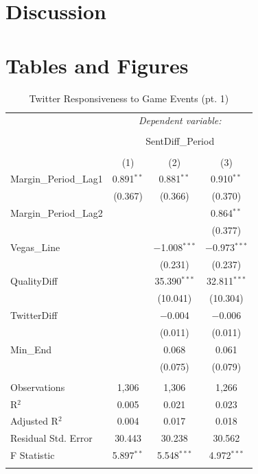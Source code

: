 \documentclass[12pt]{article}
\begin{document}
\begin{doublespacing}
\section{Discussion}



\section{Tables and Figures}

\begin{table}[H] 
\centering 
\caption{Twitter Responsiveness to Game Events (pt. 1)}\label{table:sentresponsiveness} 
\begin{tabular*}{\textwidth}{@{\extracolsep{\fill}}lccc} 
\hline 
\hline
 & \multicolumn{3}{c}{\textit{Dependent variable:}} \\ 
\cline{2-4} 
\\[-3.0ex] & \multicolumn{3}{c}{SentDiff\_Period} \\ 
\\[-1.5ex] & (1) & (2) & (3)\\ 
\hline
 Margin\_Period\_Lag1 & 0.891$^{**}$ & 0.881$^{**}$ & 0.910$^{**}$ \\ 
  & (0.367) & (0.366) & (0.370) \\ 
 Margin\_Period\_Lag2 &  &  & 0.864$^{**}$ \\ 
  &  &  & (0.377) \\ 
 Vegas\_Line &  & $-$1.008$^{***}$ & $-$0.973$^{***}$ \\ 
  &  & (0.231) & (0.237) \\ 
 QualityDiff &  & 35.390$^{***}$ & 32.811$^{***}$ \\ 
  &  & (10.041) & (10.304) \\ 
 TwitterDiff &  & $-$0.004 & $-$0.006 \\ 
  &  & (0.011) & (0.011) \\ 
 Min\_End &  & 0.068 & 0.061 \\ 
  &  & (0.075) & (0.079) \\ 
\hline \\[-1.8ex] 
Observations & 1,306 & 1,306 & 1,266 \\ 
R$^{2}$ & 0.005 & 0.021 & 0.023 \\ 
Adjusted R$^{2}$ & 0.004 & 0.017 & 0.018 \\ 
Residual Std. Error & 30.443 & 30.238 & 30.562 \\ 
F Statistic & 5.897$^{**}$ & 5.548$^{***}$ & 4.972$^{***}$ \\ 
\hline 
\hline \\[-1.8ex] 
\end{tabular*} 
\end{table} 


\end{doublespacing}
\end{document}

